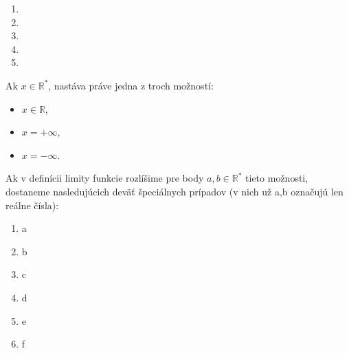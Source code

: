 \begin{enumerate}[resume]
	\item {}
	\item {}
	\item {}
	\item {}
	\item {}
\end{enumerate}

Ak $x \in \mathbb{R^*}$, nastáva práve jedna z troch možností:
\begin{itemize}
\item $x \in \mathbb{R}$,
\item $x = +\infty$,
\item $x = -\infty$.
\end{itemize}

Ak v definícii limity funkcie rozlíšime pre body $a,b \in \mathbb{R^*}$ tieto možnosti, dostaneme nasledujúcich deväť špeciálnych prípadov (v nich už a,b označujú len reálne čísla):


\begin{multicols}{2}
\begin{enumerate}
    \item a
    \item b
    \item c
    \item d
    \item e
    \item f
\end{enumerate}
\end{multicols}

